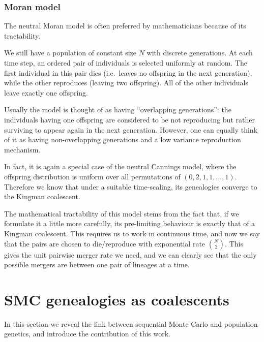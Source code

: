 \documentclass[fleqn]{article}
\theoremstyle{definition}
\begin{document}
\subsubsection{Moran model}
The neutral Moran model \citep{moran1958} is often preferred by mathematicians because of its tractability.

We still have a population of constant size $N$ with discrete generations.
At each time step, an ordered pair of individuals is selected uniformly at random. The first individual in this pair dies (i.e.\ leaves no offspring in the next generation), while the other reproduces (leaving two offspring). All of the other individuals leave exactly one offspring.

Usually the model is thought of as having ``overlapping generations'': the individuals having one offspring are considered to be not reproducing but rather surviving to appear again in the next generation.
However, one can equally think of it as having non-overlapping generations and a low variance reproduction mechanism.

In fact, it is again a special case of the neutral Cannings model, where the offspring distribution is uniform over all permutations of $(0,2,1,1,\dots,1)$.
Therefore we know that under a suitable time-scaling, its genealogies converge to the Kingman coalescent.

The mathematical tractability of this model stems from the fact that, if we formulate it a little more carefully, its pre-limiting behaviour is exactly that of a Kingman coalescent. This requires us to work in continuous time, and now we say that the pairs are chosen to die/reproduce with exponential rate $\binom{N}{2}$. This gives the unit pairwise merger rate we need, and we can clearly see that the only possible mergers are between one pair of lineages at a time.

\section{SMC genealogies as coalescents}\label{sec:SMC_coal}
In this section we reveal the link between sequential Monte Carlo and population genetics, and introduce the contribution of this work.
\end{document}
